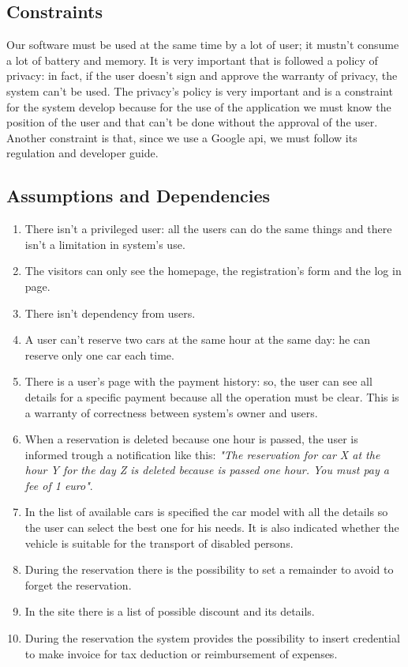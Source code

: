 
\subsection{Constraints} \label{subsec:constraints}
Our software must be used at the same time by a lot of user; it mustn't consume a lot of battery and memory. It is very important that is followed a policy of privacy: in fact, if the user doesn't sign and approve the warranty of privacy, the system can't be used. The privacy's policy is very important and is a constraint for the system develop because for the use of the application we must know the position of the user and that can't be done without the approval of the user. Another constraint is that, since we use a Google \acs{api}, we must follow its regulation and developer guide.


\subsection{Assumptions and Dependencies} \label{subsec:dependencies}
\begin{enumerate}
\item There isn't a privileged user: all the users can do the same things and there isn't a limitation in system's use.
\item The visitors can only see the homepage, the registration's form and the log in page.
\item There isn't dependency from users.
\item A user can't reserve two cars at the same hour at the same day: he can reserve only one car each time.
\item There is a user's page with the payment history: so, the user can see all details for a specific payment because all the operation must be clear. This is a warranty of correctness between system's owner and users.
\item When a reservation is deleted because one hour is passed, the user is informed trough a notification like this: \emph{"The reservation for car X at the hour Y for the day Z is deleted because is passed one hour. You must pay a fee of 1 euro"}.
\item In the list of available cars is specified the car model with all the details so the user can select the best one for his needs. It is also indicated whether the vehicle is suitable for the transport of disabled persons.
\item During the reservation there is the possibility to set a remainder to avoid to forget the reservation.
\item In the site there is a list of possible discount and its details.
\item During the reservation the system provides the possibility to insert credential to make invoice 
for tax deduction or reimbursement of expenses.
\end{enumerate}

